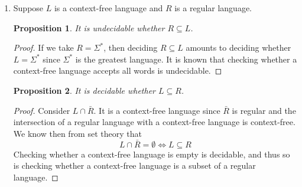 \documentclass[letterpaper,11pt]{article}
\newtheorem{proposition}{Proposition}
\begin{document}
\begin{enumerate}
\begin{enumerate}
\begin{proof}
                    Now suppose $L(G) = \Sigma^*$. Then $N\#\Sigma^*
                    \subseteq \Sigma^*\#\Sigma^*$, so
                    $L = \Sigma^*\#\Sigma^*$.
                    We can write a regular expression for $L$.
                    $$L = (a^* b^*)^* \# (a^* b^*)^*$$
                    Hence, $L$ is regular.
                \end{proof}
        \end{enumerate}

    \item
        Suppose $L$ is a context-free language and $R$ is a regular language.

        \begin{proposition}
            It is undecidable whether $R \subseteq L$.
        \end{proposition}

        \begin{proof}
            If we take $R = \Sigma^*$, then deciding $R \subseteq L$ amounts to
            deciding whether $L = \Sigma^*$ since $\Sigma^*$ is the greatest
            language. It is known that checking whether a context-free language
            accepts all words is undecidable.
        \end{proof}

        \begin{proposition}
            It is decidable whether $L \subseteq R$.
        \end{proposition}
        
        \begin{proof}
            Consider $L \cap \bar R$. It is a context-free language since $\bar
            R$ is regular and the intersection of a regular language with a
            context-free language is context-free. We know then from set theory
            that
            $$L \cap \bar R = \emptyset \iff L \subseteq R$$
            Checking whether a context-free language is empty is decidable, and
            thus so is checking whether a context-free language is a subset of
            a regular language.
        \end{proof}
\end{enumerate}
\end{document}
